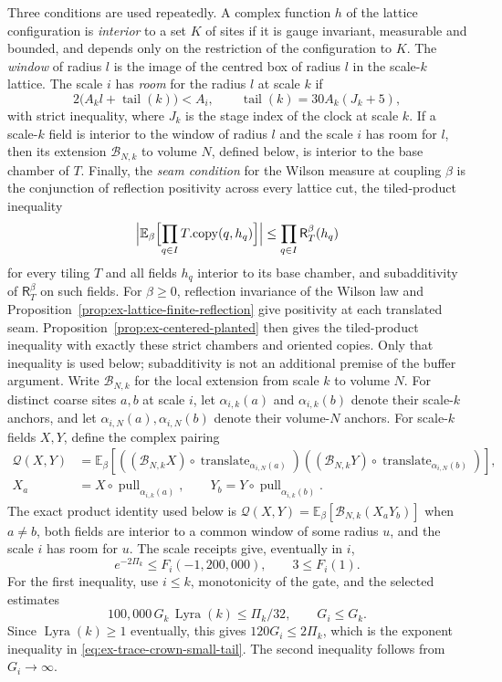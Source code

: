 Three conditions are used repeatedly. A complex function $h$ of the
lattice configuration is \emph{interior} to a set $K$ of sites if it is
gauge invariant, measurable and bounded, and depends only on the
restriction of the configuration to $K$. The \emph{window} of radius $l$
is the image of the centred box of radius $l$ in the scale-$k$ lattice. The
scale $i$ has \emph{room} for the radius $l$ at scale $k$ if
\[
 2\bigl(A_k l+\operatorname{tail}(k)\bigr)<A_i,
 \qquad \operatorname{tail}(k)=30A_k(J_k+5),
\]
with strict inequality, where $J_k$ is the stage index of the clock at scale
$k$. If a scale-$k$ field is interior to the window of radius $l$ and the
scale $i$ has room for $l$, then its extension $\mathcal B_{N,k}$ to volume
$N$, defined below, is interior to the base chamber of $T$. Finally, the
\emph{seam condition} for the Wilson measure at coupling $\beta$ is the
conjunction of reflection positivity across every lattice cut, the
tiled-product inequality
\[
 \Bigl|\mathbb E_\beta\Bigl[\prod_{q\in I}T.\mathrm{copy}(q,h_q)\Bigr]\Bigr|
 \le\prod_{q\in I}\mathsf R_T^\beta(h_q)
\]
for every tiling $T$ and all fields $h_q$ interior to its base chamber, and
subadditivity of $\mathsf R_T^\beta$ on such fields. For $\beta\ge0$, reflection invariance of the Wilson law and
Proposition~\ref{prop:ex-lattice-finite-reflection} give positivity at each
translated seam. Proposition~\ref{prop:ex-centered-planted} then gives the
tiled-product inequality with exactly these strict chambers and oriented
copies. Only that inequality is used below; subadditivity is not an
additional premise of the buffer argument.
Write $\mathcal B_{N,k}$ for the local extension from scale $k$ to volume
$N$. For distinct coarse sites $a,b$ at scale $i$, let $\alpha_{i,k}(a)$
and $\alpha_{i,k}(b)$ denote their scale-$k$ anchors, and let
$\alpha_{i,N}(a),\alpha_{i,N}(b)$ denote their volume-$N$ anchors. For
scale-$k$ fields $X,Y$, define the complex pairing
\begin{align*}
 \mathcal Q(X,Y)&=\mathbb E_\beta\!\left[
  ((\mathcal B_{N,k}X)\circ\operatorname{translate}_{\alpha_{i,N}(a)})
  ((\mathcal B_{N,k}Y)\circ\operatorname{translate}_{\alpha_{i,N}(b)})\right],\\
 X_a&=X\circ\operatorname{pull}_{\alpha_{i,k}(a)},\qquad
 Y_b=Y\circ\operatorname{pull}_{\alpha_{i,k}(b)}.
\end{align*}
The exact product identity used below is
$\mathcal Q(X,Y)=\mathbb E_\beta[\mathcal B_{N,k}(X_aY_b)]$ when $a\ne b$,
both fields are interior to a common window of some radius $u$, and the
scale $i$ has room for $u$.
The scale receipts give, eventually in $i$,
\begin{equation}
 e^{-2\Pi_k}\le F_i(-1{,}200{,}000),\qquad
 3\le F_i(1).
 \label{eq:ex-trace-crown-small-tail}
\end{equation}
For the first inequality, use $i\le k$, monotonicity of the gate, and the
selected estimates
\[100{,}000\,G_k\,\operatorname{Lyra}(k)\le\Pi_k/32,\qquad
G_i\le G_k.\] Since $\operatorname{Lyra}(k)\ge1$ eventually, this gives
$120G_i\le2\Pi_k$, which is the exponent inequality in
\eqref{eq:ex-trace-crown-small-tail}. The second inequality follows from
$G_i\to\infty$.


